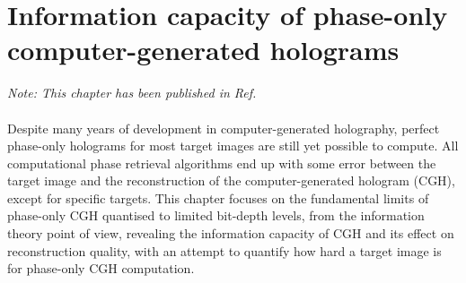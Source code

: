 \chapter{Information capacity of phase-only computer-generated holograms}
\label{chapter:information capacity}

\graphicspath{{Chapter_Information_capacity/Figs/}}

\textit{Note: This chapter has been published in Ref. \cite{Sha2024}}\\\\

Despite many years of development in computer-generated holography, perfect phase-only holograms for most target images are still yet possible to compute. All computational phase retrieval algorithms end up with some error between the target image and the reconstruction of the computer-generated hologram (CGH), except for specific targets. This chapter focuses on the fundamental limits of phase-only CGH quantised to limited bit-depth levels, from the information theory point of view, revealing the information capacity of CGH and its effect on reconstruction quality, with an attempt to quantify how hard a target image is for phase-only CGH computation.



